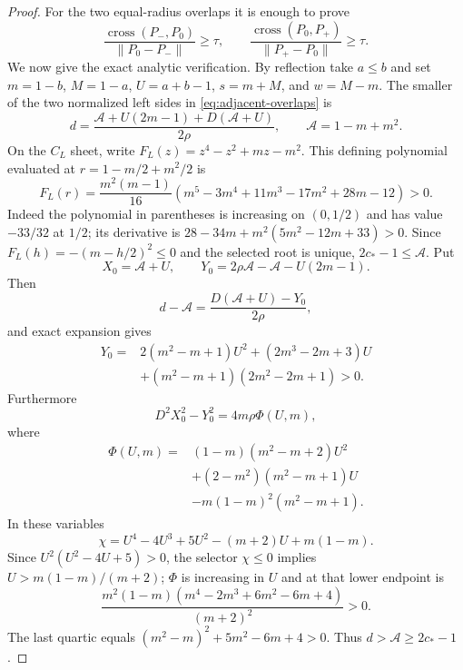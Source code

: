 \begin{proof}
For the two equal-radius overlaps it is enough to prove
\begin{equation}
 \frac{\operatorname{cross}(P_-,P_0)}{\lVert P_0-P_-\rVert}\ge\tau,
 \qquad
 \frac{\operatorname{cross}(P_0,P_+)}{\lVert P_+-P_0\rVert}\ge\tau.
 \label{eq:adjacent-overlaps}
\end{equation}
We now give the exact analytic verification.  By reflection take $a\le b$ and
set $m=1-b$, $M=1-a$, $U=a+b-1$, $s=m+M$, and $w=M-m$.  The smaller of the
two normalized left sides in \eqref{eq:adjacent-overlaps} is
\begin{equation}
 d=\frac{\mathcal A+U(2m-1)+D(\mathcal A+U)}{2\rho},
 \qquad \mathcal A=1-m+m^2.                      \label{eq:adjacent-d}
\end{equation}
On the $C_L$ sheet, write $F_L(z)=z^4-z^2+mz-m^2$.  This defining
polynomial evaluated at
$r=1-m/2+m^2/2$ is
\[
 F_L(r)=\frac{m^2(m-1)}{16}
 (m^5-3m^4+11m^3-17m^2+28m-12)>0.
\]
Indeed the polynomial in parentheses is increasing on $(0,1/2)$ and has
value $-33/32$ at $1/2$; its derivative is
$28-34m+m^2(5m^2-12m+33)>0$.  Since
$F_L(h)=-(m-h/2)^2\le0$ and the selected
root is unique, $2c_*-1\le\mathcal A$.  Put
\[
 X_0=\mathcal A+U,
 \qquad
 Y_0=2\rho\mathcal A-\mathcal A-U(2m-1).
\]
Then
\[
 d-\mathcal A=\frac{D(\mathcal A+U)-Y_0}{2\rho},
\]
and exact expansion gives
\[
\begin{aligned}
 Y_0={}&2(m^2-m+1)U^2+(2m^3-2m+3)U\\
      &+(m^2-m+1)(2m^2-2m+1)>0.
\end{aligned}
\]
Furthermore
\[
 D^2X_0^2-Y_0^2=4m\rho\Phi(U,m),
\]
where
\[
\begin{aligned}
 \Phi(U,m)={}&(1-m)(m^2-m+2)U^2\\
 &+(2-m^2)(m^2-m+1)U\\
 &-m(1-m)^2(m^2-m+1).
\end{aligned}
\]
In these variables
\[
 \chi=U^4-4U^3+5U^2-(m+2)U+m(1-m).
\]
Since $U^2(U^2-4U+5)>0$, the selector $\chi\le0$ implies
$U>m(1-m)/(m+2)$; $\Phi$ is increasing in $U$ and at that lower endpoint is
\[
 \frac{m^2(1-m)(m^4-2m^3+6m^2-6m+4)}{(m+2)^2}>0.
\]
The last quartic equals $(m^2-m)^2+5m^2-6m+4>0$.
Thus $d>\mathcal A\ge2c_*-1$.


\end{proof}
